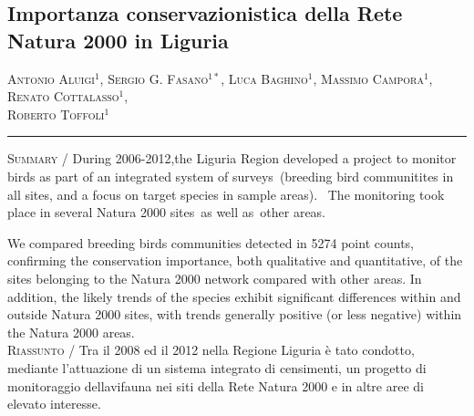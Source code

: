 \setcounter{figure}{0}
\setcounter{table}{0}

\begin{adjustwidth}{-3.5cm}{0cm}
\pagestyle{CIOpage}
\chapter*[Rete Natura 2000 in Liguria]{Importanza conservazionistica della Rete Natura 2000 in
Liguria}

\textsc{Antonio Aluigi}$^{1}$, \textsc{Sergio G. Fasano}$^{1*}$,
\textsc{Luca Baghino}$^{1}$, \textsc{Massimo Campora}$^{1}$,
\textsc{Renato Cottalasso}$^{1}$, \\\textsc{Roberto Toffoli}$^{1}$ \\

   
\noindent\color{MUSEBLUE}\rule{27cm}{2pt}
\vspace{1cm}
\end{adjustwidth}



\noindent \textsc{\color{MUSEBLUE} Summary} / During 2006-2012,the Liguria Region developed a project to monitor
birds as part of an integrated system of surveys~(breeding bird
communitites in all sites, and a focus on target species in sample
areas).~ The monitoring took place in several Natura 2000 sites~as well
as~other areas.

We compared breeding birds communities detected in 5274 point counts,
confirming the conservation importance, both qualitative and
quantitative, of the sites belonging to the Natura 2000 network
compared with other areas. In addition, the likely trends of the
species exhibit significant differences within and outside Natura 2000
sites, with trends generally positive (or less negative) within the
Natura 2000 areas.\\
\noindent \textsc{\color{MUSEBLUE} Riassunto} / Tra il 2008 ed il 2012 nella Regione Liguria \`e tato condotto, mediante
l{\textquoteright}attuazione di un sistema integrato di censimenti, un
progetto di monitoraggio dell{\textquotesingle}avifauna nei siti della
Rete Natura 2000 e in altre aree di elevato interesse.


